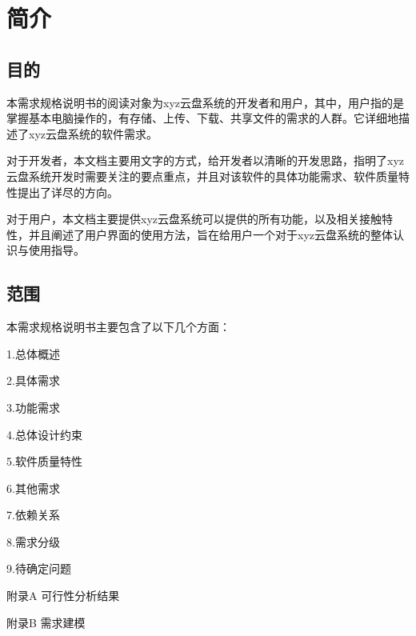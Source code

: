 \chapter{简介}
\section{目的}
本需求规格说明书的阅读对象为xyz云盘系统的开发者和用户，其中，用户指的是掌握基本电脑操作的，有存储、上传、下载、共享文件的需求的人群。它详细地描述了xyz云盘系统的软件需求。

对于开发者，本文档主要用文字的方式，给开发者以清晰的开发思路，指明了xyz云盘系统开发时需要关注的要点重点，并且对该软件的具体功能需求、软件质量特性提出了详尽的方向。

对于用户，本文档主要提供xyz云盘系统可以提供的所有功能，以及相关接触特性，并且阐述了用户界面的使用方法，旨在给用户一个对于xyz云盘系统的整体认识与使用指导。

\section{范围}
本需求规格说明书主要包含了以下几个方面：

1.总体概述

2.具体需求

3.功能需求

4.总体设计约束

5.软件质量特性

6.其他需求

7.依赖关系

8.需求分级

9.待确定问题

附录A 可行性分析结果

附录B 需求建模